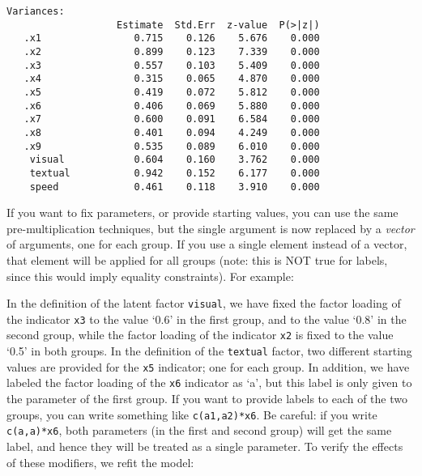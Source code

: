 \begin{verbatim}
Variances:
                   Estimate  Std.Err  z-value  P(>|z|)
   .x1                0.715    0.126    5.676    0.000
   .x2                0.899    0.123    7.339    0.000
   .x3                0.557    0.103    5.409    0.000
   .x4                0.315    0.065    4.870    0.000
   .x5                0.419    0.072    5.812    0.000
   .x6                0.406    0.069    5.880    0.000
   .x7                0.600    0.091    6.584    0.000
   .x8                0.401    0.094    4.249    0.000
   .x9                0.535    0.089    6.010    0.000
    visual            0.604    0.160    3.762    0.000
    textual           0.942    0.152    6.177    0.000
    speed             0.461    0.118    3.910    0.000
\end{verbatim}

If you want to fix parameters, or provide starting values, you can use
the same pre-multiplication techniques, but the single argument is now
replaced by a \emph{vector} of arguments, one for each group. If you use
a single element instead of a vector, that element will be applied for
all groups (note: this is NOT true for labels, since this would imply
equality constraints). For example:

\begin{Shaded}
\begin{Highlighting}[]
\end{Highlighting}
\end{Shaded}

In the definition of the latent factor \texttt{visual}, we have fixed
the factor loading of the indicator \texttt{x3} to the value `0.6' in
the first group, and to the value `0.8' in the second group, while the
factor loading of the indicator \texttt{x2} is fixed to the value `0.5'
in both groups. In the definition of the \texttt{textual} factor, two
different starting values are provided for the \texttt{x5} indicator;
one for each group. In addition, we have labeled the factor loading of
the \texttt{x6} indicator as `a', but this label is only given to the
parameter of the first group. If you want to provide labels to each of
the two groups, you can write something like \texttt{c(a1,a2)*x6}. Be
careful: if you write \texttt{c(a,a)*x6}, both parameters (in the first
and second group) will get the same label, and hence they will be
treated as a single parameter. To verify the effects of these modifiers,
we refit the model:

